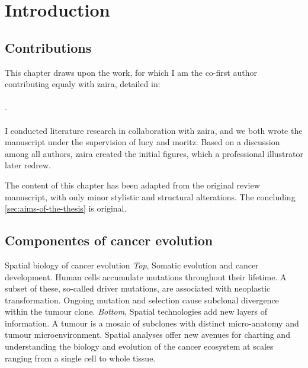 \chapter{Introduction}
\label{sec:chapter-introduction}

\section*{Contributions}

This chapter draws upon the work, for which I am the co-first author contributing equaly with \ac{zaira}, detailed in:
\\~\\
.
\\~\\
I conducted literature research in collaboration with \ac{zaira}, and we both wrote the manuscript under the supervision of \ac{lucy} and \ac{moritz}. Based on a discussion among all authors, \ac{zaira} created the initial figures, which a professional illustrator later redrew.

The content of this chapter has been adapted from the original review manuscript, with only minor stylistic and structural alterations. The concluding \cref{sec:aims-of-the-thesis} is original.

\section{Componentes of cancer evolution}

    {Spatial biology of cancer evolution \parencite{Seferbekova2023-wg}}
    {\emph{Top}, Somatic evolution and cancer development. Human cells accumulate mutations throughout their lifetime. A subset of these, so-called driver mutations, are associated with neoplastic transformation. Ongoing mutation and selection cause subclonal divergence within the tumour clone. \emph{Bottom}, Spatial technologies add new layers of information. A tumour is a mosaic of subclones with distinct micro-anatomy and tumour microenvironment. Spatial analyses offer new avenues for charting and understanding the biology and evolution of the cancer ecosystem at scales ranging from a single cell to whole tissue.}


